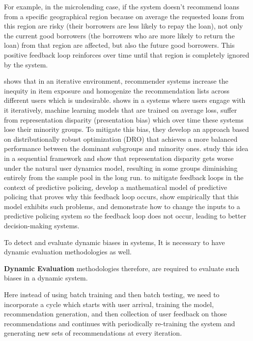     For example, in the microlending case, if the system doesn't recommend loans from a specific geographical region because on average the requested loans from this region are risky (their borrowers are less likely to repay the loan), not only the current good borrowers (the borrowers who are more likely to return the loan) from that region are affected, but also the future good borrowers. This positive feedback loop reinforces over time until that region is completely ignored by the system.
    
    \cite{Chaney2018Homo} shows that in an iterative environment, recommender systems increase the inequity in item exposure and homogenize the recommendation lists across different users which is undesirable. \cite{pmlr-v80-hashimoto18a} shows in a systems where users engage with it iteratively, machine learning models that are trained on average loss, suffer from representation disparity (presentation bias) which over time these systems lose their minority groups. To mitigate this bias, they develop an approach based on distributionally robust optimization (DRO) that achieves a more balanced performance between the dominant subgroups and minority ones. \cite{NEURIPS2019_7690dd4d} study this idea in a sequential framework and show that representation disparity gets worse under the natural user dynamics model, resulting in some groups diminishing entirely from the sample pool in the long run. to mitigate feedback loops in the context of predictive policing, \cite{pmlr-v81-ensign18a} develop a mathematical model of predictive policing that proves why this feedback loop occurs, show empirically that this model exhibits such problems, and demonstrate how to change the inputs to a predictive policing system so the feedback loop does not occur, leading to better decision-making systems.
    
    To detect and evaluate dynamic biases in systems, It is necessary to have dynamic evaluation methodologies as well.
    
    \textbf{Dynamic Evaluation} methodologies therefore, are required to evaluate such biases in a dynamic system.
    
    Here instead of using batch training and then batch testing, we need to incorporate a cycle which starts with user arrival, training the model, recommendation generation, and then collection of user feedback on those recommendations and continues with periodically re-training the system and generating new sets of recommendations at every iteration.
    
